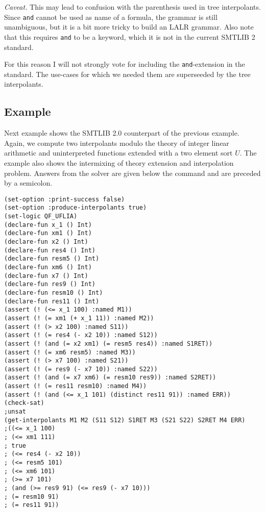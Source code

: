 \documentclass[a4paper,12pt]{article}
\begin{document}
\emph{Caveat.}  This may lead to confusion with the parenthesis used
in tree interpolants.  Since \texttt{and} cannot be used as name of a
formula, the grammar is still unambiguous, but it is a bit more tricky
to build an LALR grammar.  Also note that this requires \texttt{and} to
be a keyword, which it is not in the current SMTLIB 2 standard.  

For this reason I will not strongly vote for including the
\texttt{and}-extension in the standard.  The use-cases for which we
needed them are superseeded by the tree interpolants.

\subsection{Example}
Next example shows the SMTLIB 2.0 counterpart of the previous example.
Again, we compute two interpolants modulo the theory of integer linear
arithmetic and uninterpreted functions extended with a two element sort $U$.
The example also shows the intermixing of theory extension and interpolation
problem.
Answers from the solver are given below the command and are preceded by a
semicolon.

{\footnotesize\begin{verbatim}
(set-option :print-success false)
(set-option :produce-interpolants true)
(set-logic QF_UFLIA)
(declare-fun x_1 () Int)
(declare-fun xm1 () Int)
(declare-fun x2 () Int)
(declare-fun res4 () Int)
(declare-fun resm5 () Int)
(declare-fun xm6 () Int)
(declare-fun x7 () Int)
(declare-fun res9 () Int)
(declare-fun resm10 () Int)
(declare-fun res11 () Int)
(assert (! (<= x_1 100) :named M1))
(assert (! (= xm1 (+ x_1 11)) :named M2))
(assert (! (> x2 100) :named S11))
(assert (! (= res4 (- x2 10)) :named S12))
(assert (! (and (= x2 xm1) (= resm5 res4)) :named S1RET))
(assert (! (= xm6 resm5) :named M3))
(assert (! (> x7 100) :named S21))
(assert (! (= res9 (- x7 10)) :named S22))
(assert (! (and (= x7 xm6) (= resm10 res9)) :named S2RET))
(assert (! (= res11 resm10) :named M4))
(assert (! (and (<= x_1 101) (distinct res11 91)) :named ERR))
(check-sat)
;unsat
(get-interpolants M1 M2 (S11 S12) S1RET M3 (S21 S22) S2RET M4 ERR)
;((<= x_1 100)
; (<= xm1 111)
; true
; (<= res4 (- x2 10))
; (<= resm5 101)
; (<= xm6 101)
; (>= x7 101)
; (and (>= res9 91) (<= res9 (- x7 10)))
; (= resm10 91)
; (= res11 91))
\end{verbatim}}
\end{document}
